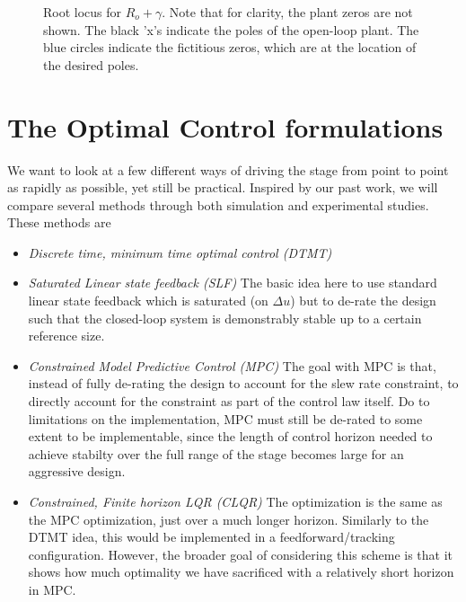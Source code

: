 \documentclass[journal,twocolumn,twoside]{IEEEtran/IEEEtran}
\begin{document}
\begin{figure}
  
  \caption{Root locus for $R_o + \gamma$. Note that for clarity, the plant zeros are not shown. The black 'x's indicate the poles of the open-loop plant. The blue circles indicate the fictitious zeros, which are at the location of the desired poles. }
  \label{fig:lqr_locus}
\end{figure}

\section{The Optimal Control formulations}
We want to look at a few different ways of driving the stage from point to point as rapidly as possible, yet still be practical. Inspired by our past work, we will compare several methods through both simulation and experimental studies. These methods are
\begin{itemize}
\item\emph{Discrete time, minimum time optimal control (DTMT)}
\item\emph{Saturated Linear state feedback (SLF)} The basic idea here to use standard linear state feedback which is saturated (on $\Delta u$) but to de-rate the design such that the closed-loop system is demonstrably stable up to a certain reference size. 
\item\emph{Constrained Model Predictive Control (MPC)} The goal with MPC is that, instead of fully de-rating the design to account for the slew rate constraint, to directly account for the constraint as part of the control law itself. Do to limitations on the implementation, MPC must still be de-rated to some extent to be implementable, since the length of control horizon needed to achieve stabilty over the full range of the stage becomes large for an aggressive design.
\item\emph{Constrained, Finite horizon LQR (CLQR)} The optimization is the same as the MPC optimization, just over a much longer horizon. Similarly to the DTMT idea, this would be implemented in a feedforward/tracking configuration. However, the broader goal of considering this scheme is that it shows how much optimality we have sacrificed with a relatively short horizon in MPC.
\end{itemize}
\end{document}
